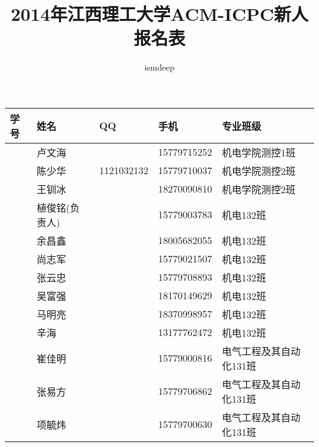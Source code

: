 \documentclass[12pt,a4paper]{article}
\begin{document}
\begin{CJK}{UTF8}{gbsn}
\title{2014年江西理工大学ACM-ICPC新人报名表}
\author{ismdeep}
\date{}


\maketitle


\begin{flushleft}


\begin{longtable}{|l|l|l|l|l|}\hline

学号       & 姓名           & QQ         & 手机        & 专业班级              \\ \hline

           & 卢文海         &            & 15779715252 & 机电学院测控1班       \\ \hline
           & 陈少华         & 1121032132 & 15779710037 & 机电学院测控2班       \\ \hline
           & 王钏冰         &            & 18270090810 & 机电学院测控2班       \\ \hline

           & 植俊铭(负责人) &            & 15779003783 & 机电132班 \\ \hline
           & 余昌鑫         &            & 18005682055 & 机电132班 \\ \hline
           & 尚志军         &            & 15779021507 & 机电132班 \\ \hline
           & 张云忠         &            & 15779708893 & 机电132班 \\ \hline
           & 吴富强         &            & 18170149629 & 机电132班 \\ \hline
           & 马明亮         &            & 18370998957 & 机电132班 \\ \hline
           & 辛海           &            & 13177762472 & 机电132班 \\ \hline

           & 崔佳明         &            & 15779000816 & 电气工程及其自动化131班 \\ \hline
           & 张易方         &            & 15779706862 & 电气工程及其自动化131班 \\ \hline
           & 项毓炜         &            & 15779700630 & 电气工程及其自动化131班 \\ \hline
                            

\end{longtable}
\end{flushleft}
\end{CJK}
\end{document}
